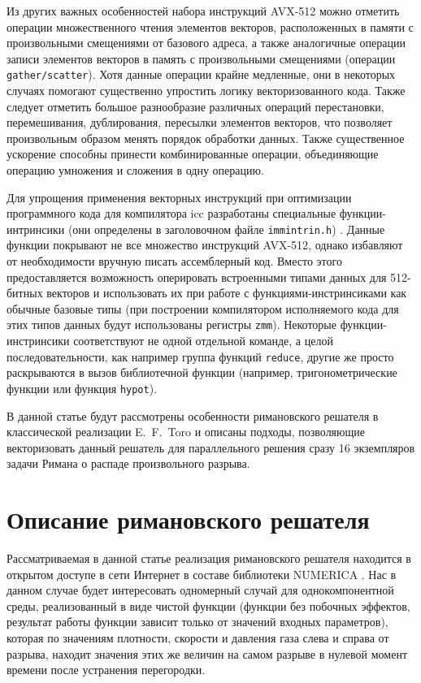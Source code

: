 \documentclass[utf8]{psta}
\begin{document}
Из других важных особенностей набора инструкций AVX-512 можно отметить операции множественного чтения элементов векторов, расположенных в памяти с произвольными смещениями от базового адреса, а также аналогичные операции записи элементов векторов в память с произвольными смещениями (операции \texttt{gather/scatter}).
Хотя данные операции крайне медленные, они в некоторых случаях помогают существенно упростить логику векторизованного кода.
Также следует отметить большое разнообразие различных операций перестановки, перемешивания, дублирования, пересылки элементов векторов, что позволяет произвольным образом менять порядок обработки данных.
Также существенное ускорение способны принести комбинированные операции, объединяющие операцию умножения и сложения в одну операцию.

Для упрощения применения векторных инструкций при оптимизации программного кода для компилятора icc разработаны специальные функции-интринсики (они определены в заголовочном файле \texttt{immintrin.h}) \cite{IntelIntrGuide}.
Данные функции покрывают не все множество инструкций AVX-512, однако избавляют от необходимости вручную писать ассемблерный код.
Вместо этого предоставляется возможность оперировать встроенными типами данных для 512-битных векторов и использовать их при работе с функциями-инстринсиками как обычные базовые типы (при построении компилятором исполняемого кода для этих типов данных будут использованы регистры \texttt{zmm}).
Некоторые функции-инстринсики соответствуют не одной отдельной команде, а целой последовательности, как например группа функций \texttt{reduce}, другие же просто раскрываются в вызов библиотечной функции (например, тригонометрические функции или функция \texttt{hypot}).

В данной статье будут рассмотрены особенности римановского решателя в классической реализации E.~F.~Toro \cite{TorRiemann} и описаны подходы, позволяющие векторизовать данный решатель для параллельного решения сразу 16 экземпляров задачи Римана о распаде произвольного разрыва.

\section{Описание римановского решателя}

Рассматриваемая в данной статье реализация римановского решателя находится в открытом доступе в сети Интернет в составе библиотеки NUMERICA \cite{Numerica}.
Нас в данном случае будет интересовать одномерный случай для однокомпонентной среды, реализованный в виде чистой функции (функции без побочных эффектов, результат работы функции зависит только от значений входных параметров), которая по значениям плотности, скорости и давления газа слева и справа от разрыва, находит значения этих же величин на самом разрыве в нулевой момент времени после устранения перегородки.
\end{document}
